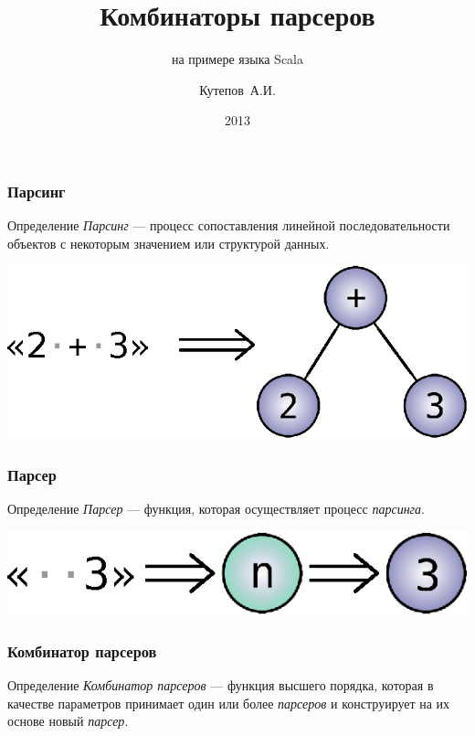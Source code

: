 \documentclass{beamer}
\title{Комбинаторы парсеров}
\subtitle{на примере языка Scala}
\author{Кутепов~А.И.}
\date{2013}
\begin{document}
\begin{frame}
  \titlepage
\end{frame}

\begin{frame}
  \frametitle{Парсинг}

  \begin{block}{Определение}
    \textit{Парсинг} --- процесс сопоставления линейной
    последовательности объектов с некоторым значением или структурой
    данных.
  \end{block}

  \pause

  \begin{center}
    \includegraphics{images/parsing-example.eps}
  \end{center}
\end{frame}

\begin{frame}
  \frametitle{Парсер}

  \begin{block}{Определение}
    \textit{Парсер} --- функция, которая осуществляет процесс
    \textit{парсинга}.
  \end{block}

  \pause

  \vspace{0.5in}
  \begin{center}
    \includegraphics{images/parser-example.eps}
  \end{center}
\end{frame}

\begin{frame}
  \frametitle{Комбинатор парсеров}
  \begin{block}{Определение}
    \textit{Комбинатор парсеров} --- функция высшего порядка, которая
    в качестве параметров принимает один или более \textit{парсеров} и
    конструирует на их основе новый \textit{парсер}.
  \end{block}

  \pause

\end{frame}
\end{document}

